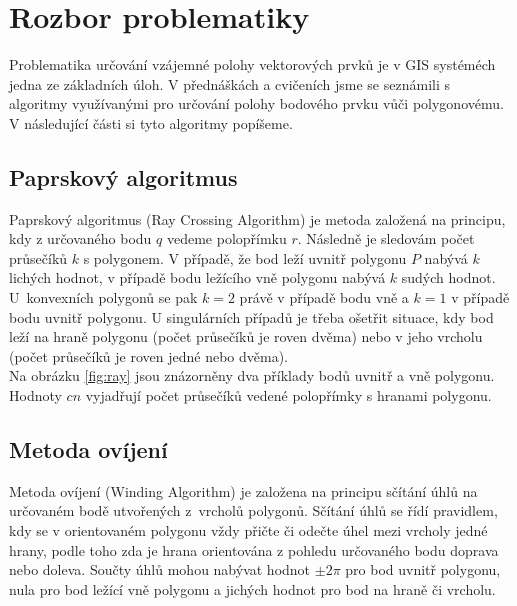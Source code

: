 \documentclass{article}
\begin{document}
\section{Rozbor problematiky}
Problematika určování vzájemné polohy vektorových prvků je v GIS systéméch jedna ze základních úloh. V přednáškách a cvičeních jsme se seznámili s algoritmy  využívanými pro určování polohy bodového prvku vůči polygonovému. V následující části si tyto algoritmy popíšeme.
\subsection{Paprskový algoritmus}
Paprskový algoritmus (Ray Crossing Algorithm) je metoda založená na principu, kdy z určovaného bodu $q$ vedeme polopřímku $r$. Následně je sledovám počet průsečíků $k$ s polygonem. V případě, že bod leží uvnitř polygonu $P$ nabývá $k$ lichých hodnot, v případě bodu ležícího vně polygonu nabývá $k$ sudých hodnot. U~konvexních polygonů se pak $k = 2$ právě v případě bodu vně a $k = 1$ v případě bodu uvnitř polygonu. U singulárních případů je třeba ošetřit situace, kdy bod leží na hraně polygonu (počet průsečíků je roven dvěma) nebo v jeho vrcholu (počet průsečíků je roven jedné nebo dvěma).\\


Na obrázku \ref{fig:ray} jsou znázorněny dva příklady bodů uvnitř a vně polygonu. Hodnoty $cn$ vyjadřují počet průsečíků vedené polopřímky s hranami polygonu. 

\subsection{Metoda ovíjení}
Metoda ovíjení (Winding Algorithm) je založena na principu sčítání úhlů na určovaném bodě utvořených z~vrcholů polygonů. Sčítání úhlů se řídí pravidlem, kdy se v orientovaném polygonu vždy přičte či odečte úhel mezi vrcholy jedné hrany, podle toho zda je hrana orientována z pohledu určovaného bodu doprava nebo doleva. Součty úhlů mohou nabývat hodnot $\pm2\pi$ pro bod uvnitř polygonu, nula pro bod ležící vně polygonu a jichých hodnot pro bod na hraně či vrcholu.
\end{document}

